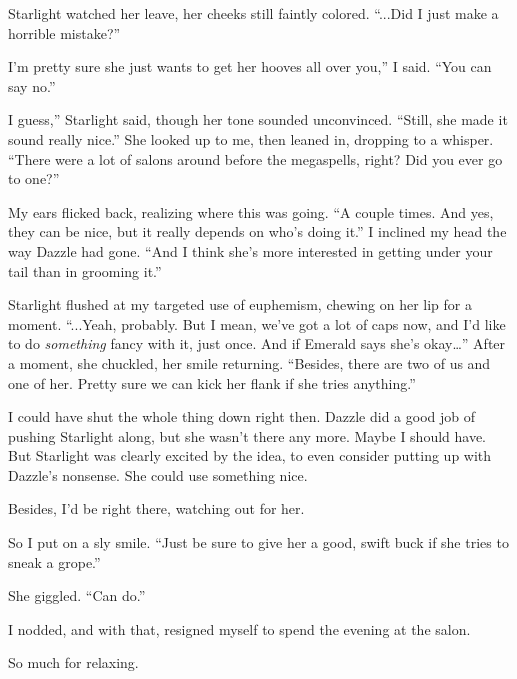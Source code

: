 Starlight watched her leave, her cheeks still faintly colored. “...Did I just make a horrible mistake?”

\leavevmode{}I’m pretty sure she just wants to get her hooves all over you,” I said. “You can say no.”

\leavevmode{}I guess,” Starlight said, though her tone sounded unconvinced. “Still, she made it sound really nice.” She looked up to me, then leaned in, dropping to a whisper. “There were a lot of salons around before the megaspells, right? Did you ever go to one?”

My ears flicked back, realizing where this was going. “A couple times. And yes, they can be nice, but it really depends on who’s doing it.” I inclined my head the way Dazzle had gone. “And I think she’s more interested in getting under your tail than in grooming it.”

Starlight flushed at my targeted use of euphemism, chewing on her lip for a moment. “...Yeah, probably. But I mean, we’ve got a lot of caps now, and I’d like to do \textit{something} fancy with it, just once. And if Emerald says she’s okay…” After a moment, she chuckled, her smile returning. “Besides, there are two of us and one of her. Pretty sure we can kick her flank if she tries anything.”

I could have shut the whole thing down right then. Dazzle did a good job of pushing Starlight along, but she wasn’t there any more. Maybe I should have. But Starlight was clearly excited by the idea, to even consider putting up with Dazzle’s nonsense. She could use something nice.

Besides, I’d be right there, watching out for her.

So I put on a sly smile. “Just be sure to give her a good, swift buck if she tries to sneak a grope.”

She giggled. “Can do.”

I nodded, and with that, resigned myself to spend the evening at the salon.

So much for relaxing.